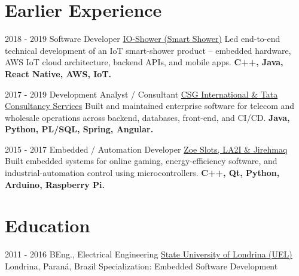 \documentclass[letterpaper]{twentysecondcv} %
\begin{document}
\section{Earlier Experience}
\begin{twenty}

\twentyitem
    {2018 - 2019}
    {Software Developer}
    {\href{http://www.showerio.com}{IO-Shower (Smart Shower)}}
    {}
    {Led end-to-end technical development of an IoT smart-shower product -- embedded hardware, AWS IoT cloud architecture, backend APIs, and mobile apps. \textbf{C++, Java, React Native, AWS, IoT.}}

\twentyitem
    {2017 - 2019}
    {Development Analyst / Consultant}
    {\href{https://www.csgi.com/}{CSG International \& Tata Consultancy Services}}
    {}
    {Built and maintained enterprise software for telecom and wholesale operations across backend, databases, front-end, and CI/CD. \textbf{Java, Python, PL/SQL, Spring, Angular.}}

\twentyitem
    {2015 - 2017}
    {Embedded / Automation Developer}
    {\href{http://la2i.com}{Zoe Slots, LA2I \& Jirehmaq}}
    {}
    {Built embedded systems for online gaming, energy-efficiency software, and industrial-automation control using microcontrollers. \textbf{C++, Qt, Python, Arduino, Raspberry Pi.}}

\end{twenty}

\section{Education}

\begin{twenty} %
	\twentyitem
    	{2011 - 2016}
        {BEng., Electrical Engineering}
        {\href{http://www.uel.br}{State University of Londrina (UEL)}}
        {Londrina, Paraná, Brazil}
        {Specialization: Embedded Software Development}
\end{twenty}
\end{document}
